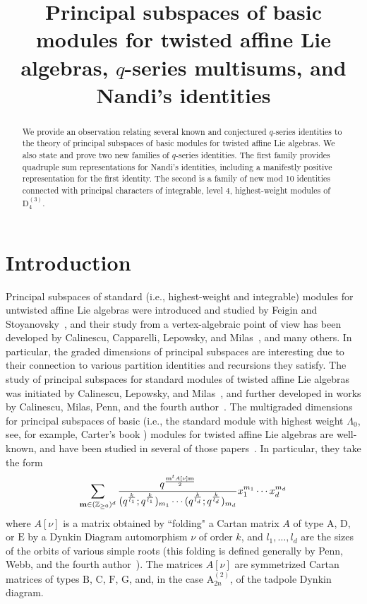 \documentclass[ALCO,Unicode,published]{cedram}
\title[Principal subspaces and $q$-series multisums]{Principal subspaces of basic modules for twisted affine Lie algebras, $q$-series multisums, and Nandi's identities}
\author[\initial{K.} \lastname{Baker}]{\firstname{Katherine} \lastname{Baker}}
\author[\initial{S.} \lastname{Kanade}]{\firstname{Shashank} \lastname{Kanade}}
\author[\initial{M.} \middlename{C.} \lastname{Russell}]{\firstname{Matthew} \middlename{C.} \lastname{Russell}}
\author[\initial{C.} \lastname{Sadowski}]{\firstname{Christopher} \lastname{Sadowski}}
\newcommand\SuppMaterial{}
\begin{document}
\begin{abstract} 
 We provide an observation relating several known and conjectured $q$-series
 identities to the theory of principal subspaces of basic modules for
 twisted affine Lie algebras. We also state and prove two new families of
 $q$-series identities. The first family provides quadruple sum
 representations for Nandi's identities, including a manifestly positive
 representation for the first identity. The second is a family of new mod 10
 identities connected with principal characters of integrable, level 4,
 highest-weight modules of $\mathrm{D}_4^{(3)}$. 
\end{abstract}

\maketitle



\section{Introduction}

Principal subspaces of standard (i.e., highest-weight and integrable) modules for untwisted affine Lie algebras were introduced and studied by Feigin and Stoyanovsky~\cite{FS1,FS2}, and their study from a vertex-algebraic point of view has been developed by Calinescu, Capparelli, Lepowsky, and Milas~\cite{CLM1,CLM2,CalLM1,CalLM2,CalLM3}, and many others. In particular, the graded dimensions of principal subspaces are interesting due to their connection to various partition identities and recursions they satisfy. The study of principal subspaces for standard modules of twisted affine Lie algebras was initiated by Calinescu, Lepowsky, and Milas~\cite{CalLM4}, and further developed in works by Calinescu, Milas, Penn, and the fourth author~\cite{CalMPe,PS1,PS2,CPS}. The multigraded dimensions for principal subspaces of basic (i.e., the standard module with highest weight $\Lambda_0$, see, for example, Carter's book \cite[P.\ 508]{Car-book}) modules for twisted affine Lie algebras are well-known, and have been studied in several of those papers~\cite{CalMPe,PS1,PS2}. In particular, they take the form
\begin{equation}\label{twistedsum}
\sum_{{\bf m} \in (\mathbb{Z}_{\ge 0})^d}\frac{q^{\frac{{\bf m}^t A[\nu] {\bf m}}{2}}}{(q^{\frac{k}{l_1}};q^{\frac{k}{l_1}})_{m_1}\cdots (q^{\frac{k}{l_d}};q^{\frac{k}{l_d}})_{m_d}}x_1^{m_1}\cdots x_d^{m_d}
\end{equation}
where $A[\nu]$ is a matrix obtained by ``folding" a Cartan matrix $A$ of type $\mathrm{A}$, $\mathrm{D}$, 
or $\mathrm{E}$ by a Dynkin Diagram automorphism $\nu$ of order $k$, and $l_1,\dots,l_d$ are the sizes of the orbits of various simple roots (this folding is defined generally by Penn, Webb, and the fourth author~\cite{PSW}). The matrices $A[\nu]$ are symmetrized Cartan matrices of types $\mathrm{B}$, $\mathrm{C}$, $\mathrm{F}$, $\mathrm{G}$, and, in the case $\mathrm{A}_{2n}^{(2)}$, of the tadpole Dynkin diagram.
\end{document}
